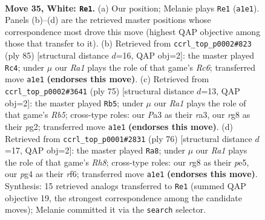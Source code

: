 \documentclass[11pt]{article}
\begin{document}
\clearpage

\begin{figure}[p]\centering
\begin{subfigure}{0.46\textwidth}\centering
\resizebox{\linewidth}{!}{%
\newchessgame
\chessboard[
  setfen={6r1/6k1/8/8/p5p1/P7/6KP/R7 w - - 4 35},
  showmover=false,
  pgfstyle=straightmove, color=movearrow, markmove={a1-e1}
]}
\caption{}
\end{subfigure}\hfill
\begin{subfigure}{0.46\textwidth}\centering
\resizebox{\linewidth}{!}{%
\newchessgame
\chessboard[
  setfen={8/p2K4/6pk/P2R4/6P1/2r5/8/8 b - - 0 43},
  showmover=false,
  pgfstyle=straightmove, color=movearrow, markmove={c3-c4}
]}
\caption{}
\end{subfigure}
\\[4pt]
\begin{subfigure}{0.46\textwidth}\centering
\resizebox{\linewidth}{!}{%
\newchessgame
\chessboard[
  setfen={8/5pk1/6p1/6P1/1r6/R5K1/6P1/8 b - - 0 38},
  showmover=false,
  pgfstyle=straightmove, color=movearrow, markmove={b4-b5}
]}
\caption{}
\end{subfigure}\hfill
\begin{subfigure}{0.46\textwidth}\centering
\resizebox{\linewidth}{!}{%
\newchessgame
\chessboard[
  setfen={7R/8/5rp1/4p3/4k2P/6K1/8/8 w - - 6 39},
  showmover=false,
  pgfstyle=straightmove, color=movearrow, markmove={h8-a8}
]}
\caption{}
\end{subfigure}
\caption{\textbf{Move 35, White: \texttt{Re1}.} (a) Our position; Melanie plays \texttt{Re1} (\texttt{a1e1}). Panels (b)--(d) are the retrieved master positions whose correspondence most drove this move (highest QAP objective among those that transfer to it). (b) Retrieved from \texttt{ccrl\_top\_p0002\#823} (ply 85) [structural distance $d$=16, QAP obj=2]: the master played \texttt{Rc4}; under $\mu$ our \emph{Ra1} plays the role of that game's \emph{Rc6}; transferred move \texttt{a1e1} \textbf{(endorses this move)}. (c) Retrieved from \texttt{ccrl\_top\_p0002\#3641} (ply 75) [structural distance $d$=13, QAP obj=2]: the master played \texttt{Rb5}; under $\mu$ our \emph{Ra1} plays the role of that game's \emph{Rb5}; cross-type roles: our \emph{P}a3 as their \emph{r}a3, our \emph{r}g8 as their \emph{p}g2; transferred move \texttt{a1e1} \textbf{(endorses this move)}. (d) Retrieved from \texttt{ccrl\_top\_p0001\#2831} (ply 76) [structural distance $d$=17, QAP obj=2]: the master played \texttt{Ra8}; under $\mu$ our \emph{Ra1} plays the role of that game's \emph{Rh8}; cross-type roles: our \emph{r}g8 as their \emph{p}e5, our \emph{p}g4 as their \emph{r}f6; transferred move \texttt{a1e1} \textbf{(endorses this move)}. Synthesis: 15 retrieved analogs transferred to \texttt{Re1} (summed QAP objective 19, the strongest correspondence among the candidate moves); Melanie committed it via the \texttt{search} selector.}
\label{fig:thought-m68}
\end{figure}
\end{document}
